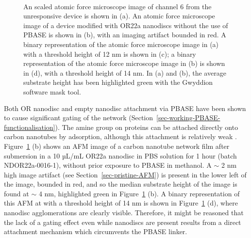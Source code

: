 \documentclass[
  a4paper,
]{scrbook}
\begin{document}
\begin{figure}
\begin{minipage}[t]{0.01\linewidth}
{~

}

\end{minipage}%

\caption[Atomic force microscope images of carbon nanotube network
device channels taken after unsuccessful OR22a nanodisc
functionalisation, either with or without the use of PBASE, and with
substrate and nanodisc heights indicated using masking and binary
representations.]{\label{fig-OR22a-variability-AFM-comparison}An scaled
atomic force microscope image of channel 6 from the unresponsive device
is shown in (a). An atomic force microscope image of a device modified
with OR22a nanodiscs without the use of PBASE is shown in (b), with an
imaging artifact bounded in red. A binary representation of the atomic
force microscope image in (a) with a threshold height of 12 nm is shown
in (c); a binary representation of the atomic force microscope image in
(b) is shown in (d), with a threshold height of 14 nm. In (a) and (b),
the average substrate height has been highlighted green with the
Gwyddion software mask tool.}

\end{figure}

Both OR nanodisc and empty nanodisc attachment via PBASE have been shown
to cause significant gating of the network
(Section~\ref{sec-working-PBASE-functionalisation}). The amine group on
proteins can be attached directly onto carbon nanotubes by adsorption,
although this attachment is relatively weak \autocite{Bradley2004}.
Figure~\ref{fig-OR22a-variability-AFM-comparison} (b) shows an AFM image
of a carbon nanotube network film after submersion in a 10 µL/mL OR22a
nanodisc in PBS solution for 1 hour (batch NDOR22a-0016-1), without
prior exposure to PBASE in methanol. A \(\sim\) 2 nm high image artifact
(see Section~\ref{sec-pristine-AFM}) is present in the lower left of the
image, bounded in red, and so the median substrate height of the image
is found at \(\sim\) 4 nm, highlighted green in
Figure~\ref{fig-OR22a-variability-AFM-comparison} (b). A binary
representation of this AFM at with a threshold height of 14 nm is shown
in Figure~\ref{fig-OR22a-variability-AFM-comparison} (d), where nanodisc
agglomerations are clearly visible. Therefore, it might be reasoned that
the lack of a gating effect even while nanodiscs are present results
from a direct attachment mechanism which circumvents the PBASE linker.
\end{document}
